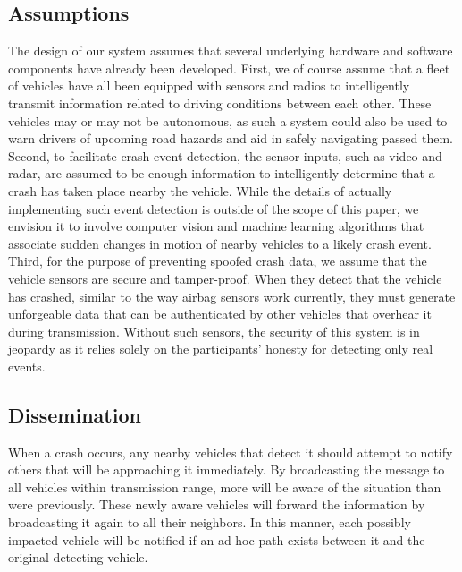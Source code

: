 \documentclass{IEEEtran}
\begin{document}
\subsection{Assumptions}

The design of our system assumes that several underlying hardware and software components have already been developed.
First, we of course assume that a fleet of vehicles have all been equipped with sensors and radios to intelligently transmit information related to driving conditions between each other.
These vehicles may or may not be autonomous, as such a system could also be used to warn drivers of upcoming road hazards and aid in safely navigating passed them.
Second, to facilitate crash event detection, the sensor inputs, such as video and radar, are assumed to be enough information to intelligently determine that a crash has taken place nearby the vehicle.
While the details of actually implementing such event detection is outside of the scope of this paper, we envision it to involve computer vision and machine learning algorithms that associate sudden changes in motion of nearby vehicles to a likely crash event.
Third, for the purpose of preventing spoofed crash data, we assume that the vehicle sensors are secure and tamper-proof.
When they detect that the vehicle has crashed, similar to the way airbag sensors work currently, they must generate unforgeable data that can be authenticated by other vehicles that overhear it during transmission.
Without such sensors, the security of this system is in jeopardy as it relies solely on the participants' honesty for detecting only real events.

\subsection{Dissemination}

When a crash occurs, any nearby vehicles that detect it should attempt to notify others that will be approaching it immediately.
By broadcasting the message to all vehicles within transmission range, more will be aware of the situation than were previously.
These newly aware vehicles will forward the information by broadcasting it again to all their neighbors.
In this manner, each possibly impacted vehicle will be notified if an ad-hoc path exists between it and the original detecting vehicle.
\end{document}
